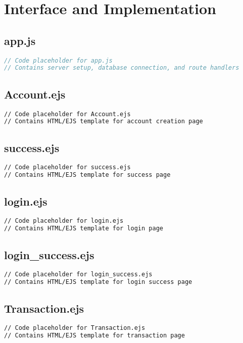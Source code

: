\documentclass[12pt,a4paper]{report}
\begin{document}
\chapter{Interface and Implementation}

\section{app.js}
\begin{lstlisting}[language=JavaScript]
// Code placeholder for app.js
// Contains server setup, database connection, and route handlers
\end{lstlisting}

\section{Account.ejs}
\begin{lstlisting}[language=HTML]
// Code placeholder for Account.ejs
// Contains HTML/EJS template for account creation page
\end{lstlisting}

\section{success.ejs}
\begin{lstlisting}[language=HTML]
// Code placeholder for success.ejs
// Contains HTML/EJS template for success page
\end{lstlisting}

\section{login.ejs}
\begin{lstlisting}[language=HTML]
// Code placeholder for login.ejs
// Contains HTML/EJS template for login page
\end{lstlisting}

\section{login\_success.ejs}
\begin{lstlisting}[language=HTML]
// Code placeholder for login_success.ejs
// Contains HTML/EJS template for login success page
\end{lstlisting}

\section{Transaction.ejs}
\begin{lstlisting}[language=HTML]
// Code placeholder for Transaction.ejs
// Contains HTML/EJS template for transaction page
\end{lstlisting}
\end{document}
